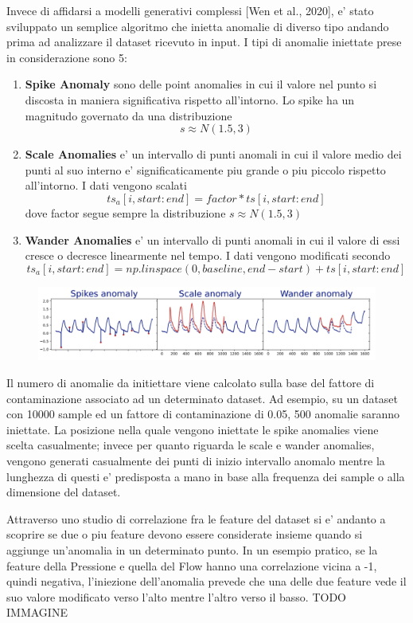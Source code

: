 Invece di affidarsi a modelli generativi complessi [Wen et al., 2020], e' stato sviluppato un semplice algoritmo che inietta anomalie di diverso tipo andando prima ad analizzare il dataset ricevuto in input. I tipi di anomalie iniettate prese in considerazione sono 5: 
\begin{enumerate}
\item \textbf{Spike Anomaly} sono delle point anomalies in cui il valore nel punto si discosta in maniera significativa rispetto all'intorno. Lo spike ha un magnitudo governato da una distribuzione \[s \approx N(1.5, 3) \]
\item \textbf{Scale Anomalies} e' un intervallo di punti anomali in cui il  valore medio dei punti al suo interno e' significaticamente piu grande o piu piccolo rispetto all'intorno. I dati vengono scalati \[ ts_a[i, start:end] = factor*ts[i, start:end]\] dove factor segue sempre la distribuzione \(s \approx N(1.5, 3) \)
\item \textbf{Wander Anomalies} e' un intervallo di punti anomali in cui il valore di essi cresce o decresce linearmente nel tempo. I dati vengono modificati secondo \[ ts_a[i, start:end] = np.linspace(0, baseline, end-start) + ts[i, start:end] \] 
\end{enumerate}
\begin{figure}[t]
\includegraphics[width=14cm, scale=1]{images/anomalies}
\centering
\end{figure}

Il numero di anomalie da initiettare viene calcolato sulla base del fattore di contaminazione associato ad un determinato dataset. Ad esempio, su un dataset con 10000 sample ed un fattore di contaminazione di 0.05, 500 anomalie saranno iniettate.
La posizione nella quale vengono iniettate le spike anomalies viene scelta casualmente; invece per quanto riguarda le scale e wander anomalies, vengono generati casualmente dei punti di inizio intervallo anomalo mentre la lunghezza di questi e' predisposta a mano in base alla frequenza dei sample o alla dimensione del dataset.

Attraverso uno studio di correlazione fra le feature del dataset si e' andanto a scoprire se due o piu feature devono essere considerate insieme quando si aggiunge un'anomalia in un determinato punto. In un esempio pratico, se la feature della Pressione e quella del Flow hanno una correlazione vicina a -1, quindi negativa, l'iniezione dell'anomalia prevede che una delle due feature vede il suo valore modificato verso l'alto mentre l'altro verso il basso. TODO IMMAGINE

